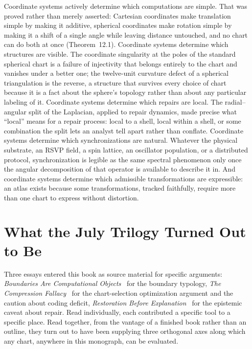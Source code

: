 \documentclass[11pt,fleqn]{book}
\numberwithin{equation}{chapter}
\theoremstyle{plain}
\theoremstyle{definition}
\theoremstyle{remark}
\providecommand{\enquote}[1]{``#1''}
\begin{document}
Coordinate systems actively determine which computations are simple. That was proved rather than merely asserted: Cartesian coordinates make translation simple by making it additive, spherical coordinates make rotation simple by making it a shift of a single angle while leaving distance untouched, and no chart can do both at once (Theorem~12.1). Coordinate systems determine which structures are visible. The coordinate singularity at the poles of the standard spherical chart is a failure of injectivity that belongs entirely to the chart and vanishes under a better one; the twelve-unit curvature defect of a spherical triangulation is the reverse, a structure that survives every choice of chart because it is a fact about the sphere's topology rather than about any particular labeling of it. Coordinate systems determine which repairs are local. The radial--angular split of the Laplacian, applied to repair dynamics, made precise what \enquote{local} means for a repair process: local to a shell, local within a shell, or some combination the split lets an analyst tell apart rather than conflate. Coordinate systems determine which synchronizations are natural. Whatever the physical substrate, an RSVP field, a spin lattice, an oscillator population, or a distributed protocol, synchronization is legible as the same spectral phenomenon only once the angular decomposition of that operator is available to describe it in. And coordinate systems determine which admissible transformations are expressible: an atlas exists because some transformations, tracked faithfully, require more than one chart to express without distortion.

\section{What the July Trilogy Turned Out to Be}

Three essays entered this book as source material for specific arguments: \emph{Boundaries Are Computational Objects}~\cite{boundaries} for the boundary typology, \emph{The Compression Fallacy}~\cite{compression-fallacy} for the chart-selection optimization argument and the caution about coding deficit, \emph{Restoration Before Explanation}~\cite{restoration} for the epistemic caveat about repair. Read individually, each contributed a specific tool to a specific place. Read together, from the vantage of a finished book rather than an outline, they turn out to have been supplying three orthogonal axes along which any chart, anywhere in this monograph, can be evaluated.
\end{document}
